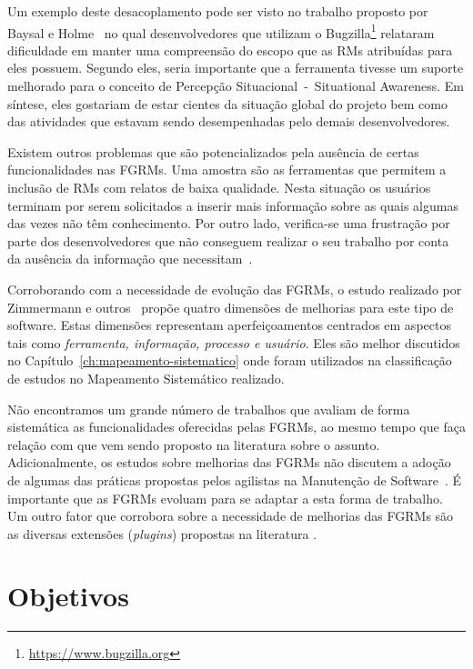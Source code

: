 Um exemplo deste desacoplamento pode ser visto no trabalho proposto por Baysal
e Holme~\cite{baysal2012qualitative} no qual desenvolvedores que utilizam o
Bugzilla\footnote{\url{https://www.bugzilla.org}} relataram dificuldade em
manter uma compreensão do escopo que as RMs atribuídas para eles possuem.
Segundo eles, seria importante que a ferramenta tivesse um suporte melhorado
para o conceito de Percepção Situacional~-~Situational Awareness. Em síntese,
eles gostariam de estar cientes da situação global do projeto bem como das
atividades que estavam sendo desempenhadas pelo demais desenvolvedores.

Existem outros problemas que são potencializados pela ausência de certas
funcionalidades nas FGRMs. Uma amostra são as ferramentas que permitem a
inclusão de RMs com relatos de baixa qualidade. Nesta situação os usuários
terminam por serem solicitados a inserir mais informação sobre as quais algumas
das vezes não têm conhecimento. Por outro lado, verifica-se uma frustração por
parte dos desenvolvedores que não conseguem realizar o seu trabalho por conta
da ausência da informação que necessitam~\cite{just2008towards}.

Corroborando com a necessidade de evolução das FGRMs, o estudo realizado por
Zimmermann e outros~\cite{zimmermann2009improving} propõe quatro dimensões de
melhorias para este tipo de software. Estas dimensões representam
aperfeiçoamentos centrados em aspectos tais como \textit{ferramenta, informação,
    processo e usuário}. Eles são melhor discutidos no
Capítulo~\ref{ch:mapeamento-sistematico} onde foram utilizados na classificação
de estudos no Mapeamento Sistemático realizado.

Não encontramos um grande número de trabalhos que avaliam de forma sistemática
as funcionalidades oferecidas pelas FGRMs, ao mesmo tempo que faça relação com
que vem sendo proposto na li\-te\-ra\-tu\-ra sobre o assunto.  Adicionalmente,
os estudos sobre melhorias das FGRMs não discutem a adoção de algumas das
práticas propostas pelos agilistas na Manutenção de Software~\cite{Soltan2016,
    Heeager2015}. É importante que as FGRMs evoluam para se adaptar a esta
forma de trabalho. Um outro fator que corrobora sobre a necessidade de
melhorias das FGRMs são as diversas extensões (\textit{plugins}) propostas na
literatura
\cite{101186,Thung:2014:BIT:2635868.2661678,Kononenko:2014:DED:2591062.2591075}.

\section{Objetivos}
\label{sec:intro-objetivos}

